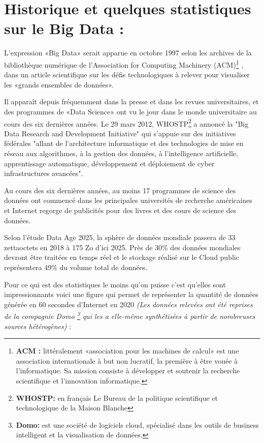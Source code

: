 \section{Historique et quelques statistiques sur le Big Data : }
L'expression «Big Data» serait apparue en octobre 1997 selon les archives de la bibliothèque numérique de l'Association for Computing Machinery (ACM)\footnote{\textbf{ACM :} littéralement «association pour les machines de calcul» est une association internationale à but non lucratif, la première à être vouée à l'informatique. Sa mission consiste à développer et soutenir la recherche scientifique et l'innovation informatique.}
, dans un article scientifique sur les défis technologiques à relever pour visualiser les «grands ensembles de données». \cite{BDHistory}

Il apparaît depuis fréquemment dans la presse et dans les revues universitaires, et des programmes de «Data Science» ont vu le jour dans le monde universitaire au cours des six dernières années. Le 29 mars 2012, WHOSTP\footnote{\textbf{WHOSTP: }en français Le Bureau de la politique scientifique et technologique de la Maison Blanche} a annoncé la "Big Data Research and Development Initiative" qui s'appuie sur des initiatives fédérales "allant de l'architecture informatique et des technologies de mise en réseau aux algorithmes, à la gestion des données, à l'intelligence artificielle, apprentissage automatique, développement et déploiement de cyber infrastructures avancées". \cite{ridgeway2018policing}

Au cours des six dernières années, au moins 17 programmes de science des données ont commencé dans les principales universités de recherche américaines et Internet regorge de publicités pour des livres et des cours de science des données. 

Selon l'étude Data Age 2025, la sphère de données mondiale passera de 33 zettaoctets en 2018 à 175 Zo d'ici 2025. Près de 30\% des données mondiales devront être traitées en temps réel et le stockage réalisé sur le Cloud public représentera 49\% du volume total de données.

Pour ce qui est des statistiques le moins qu'on puisse c'est qu'elles sont impressionnants voici une figure qui permet de représenter la quantité de données générée en 60 secondes d'Internet en 2020 
\textit{(Les données relevées ont été reprises de la compagnie Domo \footnote{\textbf{Domo: } est une société de logiciels cloud, spécialisé dans les outils de business intelligent et la visualisation de données.} qui les a elle-même synthétisées à partir de nombreuses sources hétérogènes)} : \cite{1Minute}


